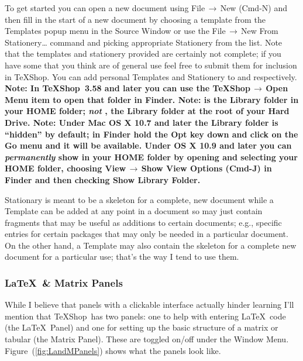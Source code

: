 \documentclass[letterpaper,11pt]{article}
\newcommand{\TS}{\textsf{\TeX Shop}}
\newcommand{\cmd}[1]{\textsf{#1}}
\newcommand{\mnu}[1]{\textsf{#1}}
\newcommand{\To}{\,\(\to\)\,}
\begin{document}
To get started you can open a new document using \mnu{File}\To\mnu{New} (\cmd{Cmd-N}) and then fill in the start of a new document by choosing a template from the \mnu{Templates} popup menu in the Source Window or use the \mnu{File}\To\mnu{New From Stationery…} command and picking appropriate Stationery from the list. Note that the templates and stationery provided are certainly not complete; if you have some that you think are of general use feel free to submit them for inclusion in \TS. You can add personal Templates and Stationery to  and  respectively. \textbf{Note: In \TS\ 3.58 and later you can use the \mnu{TeXShop}\To\mnu{Open } Menu item to open that folder in Finder. Note:  is the \cmd{Library} folder in your \cmd{HOME} folder; \emph{not} , the \cmd{Library} folder at the \cmd{root} of your Hard Drive. Note: Under \textsf{Mac OS X 10.7 and later} the \cmd{Library} folder is ``hidden'' by default; in \cmd{Finder} hold the \cmd{Opt} key down and click on the \mnu{Go} menu and it will be available. Under \textsf{OS X 10.9 and later} you can \emph{permanently} show  in your \cmd{HOME} folder by opening and selecting your \cmd{HOME} folder, choosing \mnu{View}\To\mnu{Show View Options} (\cmd{Cmd-J}) in \cmd{Finder} and then checking \cmd{Show Library Folder}.}

Stationary is meant to be a skeleton for a complete, new document while a Template can be added at any point in a document so may just contain fragments that may be useful as additions to certain documents; e.g., specific entries for certain packages that may only be needed in a particular document. On the other hand, a Template may also contain the skeleton for a complete new document for a particular use; that's the way I tend to use them.

\subsubsection{\LaTeX\ \& Matrix Panels}

While I believe that panels with a clickable interface actually hinder learning I'll mention that \TS\ has two panels: one to help with entering \LaTeX\ code (the \LaTeX\ Panel) and one for setting up the basic structure of a matrix or tabular (the Matrix Panel). These are toggled on/off under the \mnu{Window} Menu. %
 Figure~(\ref{fig:LandMPanels}) shows what the panels look like.
\end{document}
